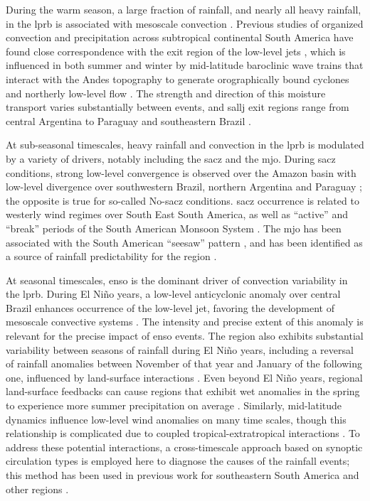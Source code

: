 \documentclass[twocol]{ametsoc}
\begin{document}
During the warm season, a large fraction of rainfall, and nearly all heavy rainfall, in the \gls{lprb} is associated with mesoscale convection \citep{Velasco1987}.
Previous studies of organized convection and precipitation across subtropical continental South America have found close correspondence with the exit region of the low-level jets \citep{Velasco1987,Marengo2004,Saulo2007,Salio2007}, which is influenced in both summer and winter by mid-latitude baroclinic wave trains that interact with the Andes topography to generate orographically bound cyclones and northerly low-level flow \citep{Campetella2002,Seluchi2006,Boers2013,Boers2014}.
The strength and direction of this moisture transport varies substantially between events, and \gls{sallj} exit regions range from central Argentina \citep[``Chaco Jet Events'';][]{Salio2002} to Paraguay and southeastern Brazil \citep[``No-Chaco Jet Events'';][]{Vera2006}.

At sub-seasonal timescales, heavy rainfall and convection in the \gls{lprb} is modulated by a variety of drivers, notably including the \gls{sacz} and the \gls{mjo}.
During \gls{sacz} conditions, strong low-level convergence is observed over the Amazon basin with low-level divergence over southwestern Brazil, northern Argentina and Paraguay \citep{Herdies2002,Carvalho2010}; the opposite is true for so-called No-\gls{sacz} conditions.
\Gls{sacz} occurrence is related to westerly wind regimes over South East South America, as well as ``active'' and ``break'' periods of the South American Monsoon System \citep{Marengo2004}.
The \gls{mjo} has been associated with the South American ``seesaw'' pattern \citep{Nogues-Paegle1997,Paegle2000,Liebmann2004}, and has been identified as a source of rainfall predictability for the region \citep[e.g.][]{Munoz2015}.

At seasonal timescales, \gls{enso} is the dominant driver of convection variability in the \gls{lprb}.
During El Ni\~no years, a low-level anticyclonic anomaly over central Brazil enhances occurrence of the low-level jet, favoring the development of mesoscale convective systems \citep{Velasco1987}.
The intensity and precise extent of this anomaly is relevant for the precise impact of \gls{enso} events.
The region also exhibits substantial variability between seasons of rainfall during El Ni\~no years, including a reversal of rainfall anomalies between November of that year and January of the following one, influenced by land-surface interactions \citep{Grimm2003,Grimm2009}.
Even beyond El Ni\~no years, regional land-surface feedbacks can cause regions that exhibit wet anomalies in the spring to experience more summer precipitation on average \citep{Grimm2007}.
Similarly, mid-latitude dynamics influence low-level wind anomalies on many time scales, though this relationship is complicated due to coupled tropical-extratropical interactions \citep{Jones2002,Carvalho2004}.
To address these potential interactions, a cross-timescale approach based on synoptic circulation types is employed here to diagnose the causes of the rainfall events; this method has been used in previous work for southeastern South America \citep{Munoz2015,Munoz2016} and other regions \citep{Moron2015}.
\end{document}
